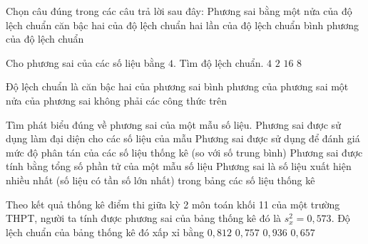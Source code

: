 \begin{ex}%
	Chọn câu đúng trong các câu trả lời sau đây: Phương sai bằng
	\choice
	{một nửa của độ lệch chuẩn}
	{căn bậc hai của độ lệch chuẩn}
	{hai lần của độ lệch chuẩn}
	{\True bình phương của độ lệch chuẩn}
\end{ex}	

\begin{ex}%
	Cho phương sai của các số liệu bằng $4$. Tìm độ lệch chuẩn.
	\choice
	{$4$}
	{\True $2$}
	{$16$}
	{$8$}
\end{ex}	

\begin{ex}%
	Độ lệch chuẩn là
	\choice
	{\True căn bậc hai của phương sai}
	{bình phương của phương sai}
	{một nửa của phương sai}
	{không phải các công thức trên}
\end{ex}	

\begin{ex}%
	Tìm phát biểu đúng về phương sai của một mẫu số liệu.
	\choice
	{Phương sai được sử dụng làm đại diện cho các số liệu của mẫu}
	{\True Phương sai được sử dụng để đánh giá mức độ phân tán của các số liệu thống kê (so với số trung bình)}
	{Phương sai được tính bằng tổng số phần tử của một mẫu số liệu}
	{Phương sai là số liệu xuất hiện nhiều nhất (số liệu có tần số lớn nhất) trong bảng các số
		liệu thống kê}
\end{ex}	

\begin{ex}%
	Theo kết quả thống kê điểm thi giữa kỳ 2 môn toán khối 11 của một trường THPT, người ta tính được phương sai của bảng thống kê đó là $s_x^2=0{,}573$. Độ lệch chuẩn của bảng thống kê đó xấp xỉ bằng
	\choice
	{$0{,}812$}
	{\True $0{,}757$}
	{$0{,}936$}
	{$0{,}657$}
\end{ex}	

